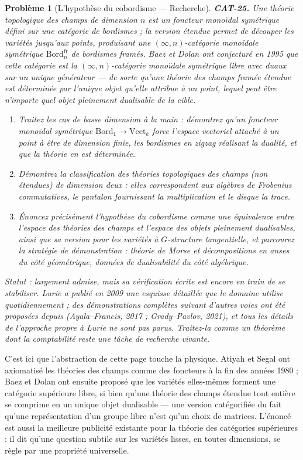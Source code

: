 \documentclass[11pt]{article}
\newtheorem{problem}{Problème}
\begin{document}
\begin{problem}[{L'hypothèse du cobordisme --- Recherche}]
\textbf{CAT-25.} Une théorie topologique des champs de dimension $ n $ est un foncteur
monoïdal symétrique défini sur une catégorie de bordismes ; la version \textit{étendue} permet de
découper les variétés jusqu'aux points, produisant une $ (\infty, n) $-catégorie monoïdale
symétrique $ \mathrm{Bord}_n^{\mathrm{fr}} $ de bordismes framés. Baez et Dolan ont conjecturé en
1995 que cette catégorie est la $ (\infty, n) $-catégorie monoïdale symétrique libre avec duaux
sur un unique générateur --- de sorte qu'une théorie des champs framée étendue est déterminée par
l'unique objet qu'elle attribue à un point, lequel peut être n'importe quel objet
\textit{pleinement dualisable} de la cible.
\begin{enumerate}
\item[(a)] Traitez les cas de basse dimension à la main : démontrez qu'un foncteur monoïdal symétrique
$ \mathrm{Bord}_1 \to \mathrm{Vect}_k $ force l'espace vectoriel attaché à un point à être de
dimension finie, les bordismes en zigzag réalisant la dualité, et que la théorie en est
déterminée.
\item[(b)] Démontrez la classification des théories topologiques des champs (non étendues) de dimension
deux : elles correspondent aux algèbres de Frobenius commutatives, le pantalon fournissant la
multiplication et le disque la trace.
\item[(c)] Énoncez précisément l'hypothèse du cobordisme comme une équivalence entre l'espace des théories
des champs et l'espace des objets pleinement dualisables, ainsi que sa version pour les variétés à
$ G $-structure tangentielle, et parcourez la stratégie de démonstration : théorie de Morse et
décompositions en anses du côté géométrique, données de dualisabilité du côté algébrique.
\end{enumerate}
\textit{Statut : largement admise, mais sa vérification écrite est encore en train de se stabiliser.
Lurie a publié en 2009 une esquisse détaillée que le domaine utilise quotidiennement ; des
démonstrations complètes suivant d'autres voies ont été proposées depuis (Ayala--Francis, 2017 ;
Grady--Pavlov, 2021), et tous les détails de l'approche propre à Lurie ne sont pas parus. Traitez-la
comme un théorème dont la comptabilité reste une tâche de recherche vivante.}
\end{problem}

\noindent C'est ici que l'abstraction de cette page touche la physique. Atiyah et Segal
ont axiomatisé les théories des champs comme des foncteurs à la fin des années 1980 ; Baez et Dolan
ont ensuite proposé que les variétés elles-mêmes forment une catégorie supérieure libre, si bien
qu'une théorie des champs étendue tout entière se comprime en un unique objet dualisable --- une
version catégorifiée du fait qu'une représentation d'un groupe libre n'est qu'un choix de matrices.
L'énoncé est aussi la meilleure publicité existante pour la théorie des catégories supérieures : il
dit qu'une question subtile sur les variétés lisses, en toutes dimensions, se règle par une
propriété universelle.
\end{document}
